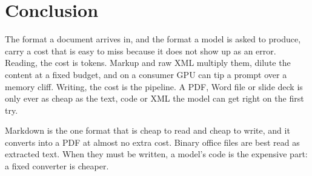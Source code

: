 \section{Conclusion}
\label{sec:conclusion}

The format a document arrives in, and the format a model is asked to
produce, carry a cost that is easy to miss because it does not show up
as an error. Reading, the cost is tokens. Markup and raw XML multiply
them, dilute the content at a fixed budget, and on a consumer GPU can tip
a prompt over a memory cliff. Writing, the cost is the pipeline. A PDF,
Word file or slide deck is only ever as cheap as the text, code or XML
the model can get right on the first try.

Markdown is the one format that is cheap to read and cheap to write, and
it converts into a PDF at almost no extra cost. Binary office files are
best read as extracted text. When they must be written, a model's code is
the expensive part: a fixed converter is cheaper.
